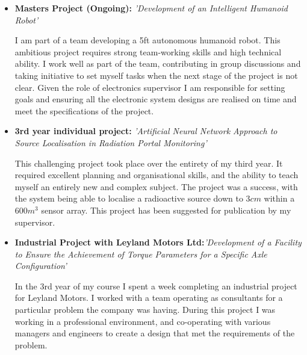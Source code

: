 \documentclass[11pt,a4paper,sans]{moderncv}        %
\begin{document}
\begin{itemize}

\item{\textbf{Masters Project (Ongoing):} \textit{'Development of an Intelligent Humanoid Robot'}

\vspace{3pt}

\small{I am part of a team developing a 5ft autonomous humanoid robot. This ambitious project requires strong team-working skills and high technical ability. I work well as part of the team, contributing in group discussions and taking initiative to set myself tasks when the next stage of the project is not clear. Given the role of electronics supervisor I am responsible for setting goals and ensuring all the electronic system designs are realised on time and meet the specifications of the project.}}

\newpage

\item{\textbf{3rd year individual project:} \textit{'Artificial Neural Network Approach to Source Localisation in Radiation Portal Monitoring'}

\vspace{3pt}

\small{This challenging project took place over the entirety of my third year. It required excellent planning and organisational skills, and the ability to teach myself an entirely new and complex subject. The project was a success, with the system being able to localise a radioactive source down to $ 3 cm$ within a $ 600 m^3$ sensor array. This project has been suggested for publication by my supervisor.}}

\vspace{6pt}

\item{\textbf{Industrial Project with Leyland Motors Ltd:}\textit{'Development of a Facility to Ensure the Achievement of Torque Parameters for a Specific Axle Configuration'}

\vspace{3pt}

\small{In the 3rd year of my course I spent a week completing an industrial project for Leyland Motors. I worked with a team operating as consultants for a particular problem the company was having. During this project I was working in a professional environment, and co-operating with various managers and engineers to create a design that met the requirements of the problem.}}

\end{itemize}
\end{document}
